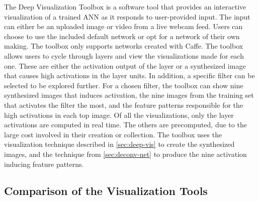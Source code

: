 The Deep Visualization Toolbox is a software tool that provides an interactive visualization of a trained ANN as it responds to user-provided input. The input can either be an uploaded image or video from a live webcam feed. Users can choose to use the included default network or opt for a network of their own making. The toolbox only supports networks created with Caffe. The toolbox allows users to cycle through layers and view the visualizations made for each one. These are either the activation output of the layer or a synthesized image that causes high activations in the layer units. In addition, a specific filter can be selected to be explored further. For a chosen filter, the toolbox can show nine synthesized images that induces activation, the nine images from the training set that activates the filter the most, and the feature patterns responsible for the high activations in each top image. Of all the visualizations, only the layer activations are computed in real time. The others are precomputed, due to the large cost involved in their creation or collection. The toolbox uses the visualization technique described in \autoref{sec:deep-vis} to create the synthesized images, and the technique from \autoref{sec:deconv-net} to produce the nine activation inducing feature patterns.


\subsection{Comparison of the Visualization Tools}

